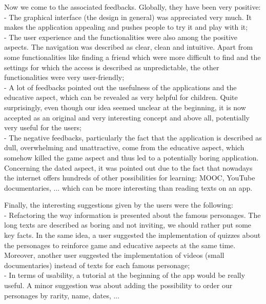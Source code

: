 \documentclass[12pt]{scrartcl}
\begin{document}
	Now we come to the associated feedbacks. Globally, they have been very positive:\\

		- The graphical interface (the design in general) was appreciated very much. It makes the application appealing and pushes people to try it and play with it;\\

		- The user experience and the functionalities were also among the positive aspects. The navigation was described as clear, clean and intuitive. Apart from some functionalities like finding a friend which were more difficult to find and the settings for which the access is described as unpredictable, the other functionalities were very user-friendly;\\

		- A lot of feedbacks pointed out the usefulness of the applications and the educative aspect, which can be revealed as very helpful for children. Quite surprisingly, even though our idea seemed unclear at the beginning, it is now accepted as an original and very interesting concept and above all, potentially very useful for the users;\\

		- The negative feedbacks, particularly the fact that the application is described as dull, overwhelming and unattractive, come from the educative aspect, which somehow killed the game aspect and thus led to a potentially boring application. Concerning the dated aspect, it was pointed out due to the fact that nowadays the internet offers hundreds of other possibilities for learning: MOOC, YouTube documentaries, ... which can be more interesting than reading texts on an app.\\
		\newline

	Finally, the interesting suggestions given by the users were the following:\\

		- Refactoring the way information is presented about the famous personages. The long texts are described as boring and not inviting, we should rather put some key facts. In the same idea, a user suggested the implementation of quizzes about the personages to reinforce game and educative aspects at the same time. Moreover, another user suggested the implementation of videos (small documentaries) instead of texts for each famous personage;\\

		- In terms of usability, a tutorial at the beginning of the app would be really useful. A minor suggestion was about adding the possibility to order our personages by rarity, name, dates, ...\\
\end{document}
